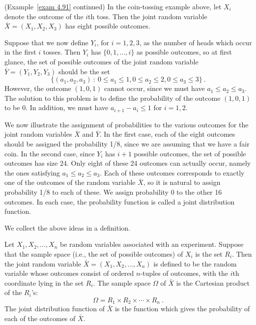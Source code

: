 \begin{example}(Example~\ref{exam 4.91} continued){\label{exam 4.92}}
In the coin-tossing example above, let $X_i$ denote the outcome of the $i$th toss.  Then the
joint random variable ${\bar X} = (X_1, X_2, X_3)$ has eight possible outcomes.
\par
Suppose that we now define $Y_i$, for $i = 1, 2, 3$, as the number of heads which occur in
the first $i$ tosses.  Then $Y_i$ has $\{0, 1, \ldots, i\}$ as possible outcomes, so at
first glance, the set of possible outcomes of the joint random variable ${\bar Y} = (Y_1,
Y_2, Y_3)$ should be the set
$$\{(a_1, a_2, a_3)\ :\ 0 \le a_1 \le 1, 0 \le a_2 \le 2, 0 \le a_3 \le 3\}\ .$$
However, the outcome $(1, 0, 1)$ cannot occur, since we must have $a_1 \le a_2 \le a_3$.  The
solution to this problem is to define the probability of the outcome $(1, 0, 1)$ to be 0.  In addition, we must
have $a_{i+1} - a_i \le 1$ for $i = 1, 2$.
\par
We now illustrate the assignment of probabilities to the various outcomes for the joint
random variables ${\bar X}$ and ${\bar Y}$.  In the first case, each of the
eight outcomes should be assigned the probability 1/8, since we are assuming that we have a
fair coin.  In the second case, since $Y_i$ has $i+1$ possible outcomes, the set of possible
outcomes has size 24.    Only eight of these 24 outcomes can actually occur, namely the ones
satisfying $a_1 \le a_2 \le a_3$.  Each of these outcomes corresponds to exactly one of the
outcomes of the random variable ${\bar X}$, so it is natural to assign probability 1/8
to each of these.  We assign probability 0 to the other 16 outcomes.  In each case, the
probability function is called a joint distribution function.
\end{example}

We collect the above ideas in a definition.

\begin{definition}\label{def 4.4}
Let $X_1, X_2, \ldots, X_n$ be random variables associated with an experiment.  Suppose
that the sample space (i.e., the set of possible outcomes) of $X_i$ is the set $R_i$.  Then
the joint random variable ${\bar
X} = (X_1, X_2,
\ldots, X_n)$ is defined to be the random variable whose outcomes consist of ordered $n$-tuples
of outcomes, with the
$i$th coordinate lying in the set $R_i$.  The sample space $\Omega$ of ${\bar X}$ is the
Cartesian product of the $R_i$'s:  
$$\Omega = R_1 \times R_2 \times \cdots \times R_n\ .$$
The joint distribution function of
${\bar X}$ is the function which gives the probability of each of the outcomes of
${\bar X}$.
\end{definition}

